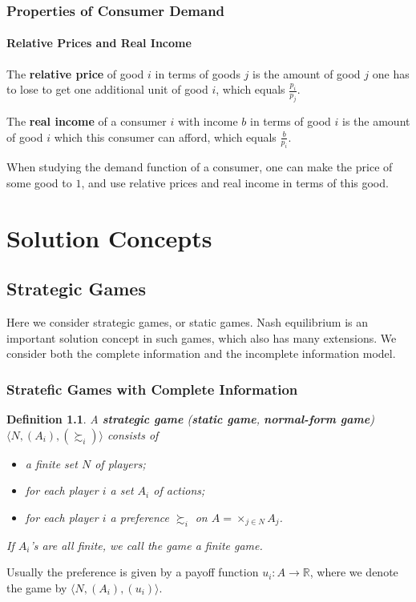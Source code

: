 \documentclass[openany]{book}
\newtheorem{definition}{Definition}[chapter]
\theoremstyle{remark}
\begin{document}
\section{Properties of Consumer Demand}
\subsection{Relative Prices and Real Income}
The \textbf{relative price} of good $i$ in terms of goods $j$ is the amount of good $j$ one has to lose to get one additional unit of good $i$, which equals $\frac{p_i}{p_j}$.

The \textbf{real income} of a consumer $i$ with income $b$ in terms of good $i$ is the amount of good $i$ which this consumer can afford, which equals $\frac{b}{p_i}$.

When studying the demand function of a consumer, one can make the price of some good to $1$, and use relative prices and real income in terms of this good.

\part{Solution Concepts}
\chapter{Strategic Games}
Here we consider strategic games, or static games. Nash equilibrium is an important solution concept in such games, which also has many extensions. We consider both the complete information and the incomplete information model.

\section{Stratefic Games with Complete Information}
\begin{definition}
    A \textbf{strategic game} (\textbf{static game}, \textbf{normal-form game}) $\langle N,(A_i),(\succsim_i)\rangle$ consists of
    \begin{itemize}
        \item a finite set $N$ of players;
        \item for each player $i$ a set $A_i$ of actions;
        \item for each player $i$ a preference $\succsim_i$ on $A=\times_{j\in N}A_j$.
    \end{itemize}
    If $A_i$'s are all finite, we call the game a finite game.
\end{definition}
Usually the preference is given by a payoff function $u_i:A\rightarrow\mathbb{R}$, where we denote the game by $\langle N,(A_i),(u_i)\rangle$.
\end{document}
